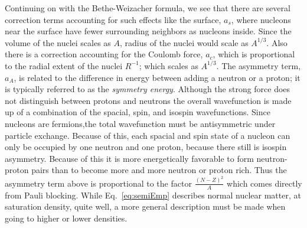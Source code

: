 Continuing on with the Bethe-Weizacher formula, we see that there are several correction terms accounting for such effects like the surface, $a_s$, where nucleons near the surface have fewer surrounding neighbors as nucleons inside. Since the volume of the nuclei scales as $A$, radius of the nuclei would scale as $A^{1/3}$. Also there is a correction accounting for the Coulomb force, $a_c$, which is proportional to the radial extent of the nuclei $R^{-1}$; which scales as $A^{1/3}$. The asymmetry term, $a_A$, is related to the difference in energy between adding a neutron or a proton; it is typically referred to as the \emph{symmetry energy}. Although the strong force does not distinguish between protons and neutrons the overall wavefunction is made up of a combination of the spacial, spin, and isospin wavefunctions. Since nucleons are fermions,the total wavefunction must be antisymmetric under particle exchange. Because of this, each spacial and spin state of a nucleon can only be occupied by one neutron and one proton, because there still is isospin asymmetry.  Because of this it is more energetically favorable to form neutron-proton pairs than to become more and more neutron or proton rich. Thus the asymmetry term above is proportional to the factor $\frac{(N - Z)^2}{A}$ which comes directly from Pauli blocking. While Eq.~\ref{eq:semiEmp} describes normal nuclear matter, at saturation density, quite well, a more general description must be made when going to higher or lower densities. 



